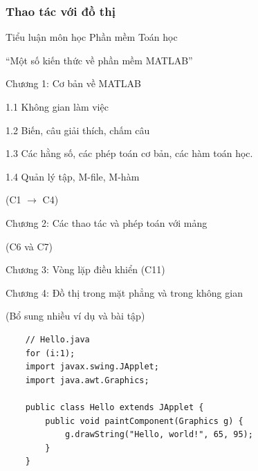 \documentclass[12pt,a4paper]{article}
\begin{document}
\subsubsection{Thao tác với đồ thị}

	
	
	Tiểu luận môn học Phần mềm Toán học

“Một số kiến thức về phần mềm MATLAB”

Chương 1: Cơ bản về MATLAB

1.1  Không gian làm việc

1.2  Biến, câu giải thích, chấm câu

1.3  Các hằng số, các phép toán cơ bản, các hàm toán học.

1.4  Quản lý tập, M-file, M-hàm

(C1 $\rightarrow$ C4)

Chương 2: Các thao tác và phép toán với mảng

(C6 và C7)

Chương 3: Vòng lặp điều khiển (C11)

Chương 4: Đồ thị trong mặt phẳng và trong không gian

(Bổ sung nhiều ví dụ và bài tập)
	\begin{lstlisting}
	// Hello.java
	for (i:1);
	import javax.swing.JApplet;
	import java.awt.Graphics;

	public class Hello extends JApplet {
    	public void paintComponent(Graphics g) {
        	g.drawString("Hello, world!", 65, 95);
    	}    
	}
	\end{lstlisting}
	
\end{document}
